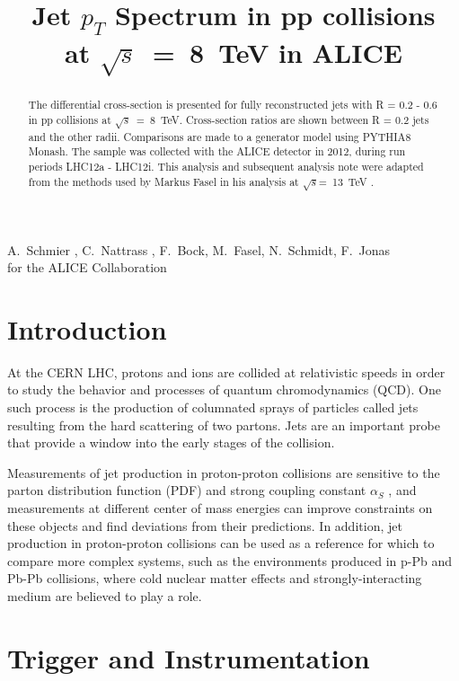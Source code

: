 \documentclass[ALICE]{ALICE_analysis_notes}
\newcommand{\s}{$\sqrt{s}$\xspace}
\newcommand{\pp}{pp\xspace}
\begin{document}
\title{Jet $p_T$ Spectrum in pp collisions \\
at $\sqrt{s}$~=~8~TeV in ALICE}


\begin{Authlist}
A.~Schmier ,
C.~Nattrass ,
F.~Bock, 
M.~Fasel,
N.~Schmidt,
F.~Jonas\\
for the ALICE Collaboration
\end{Authlist}



\vspace{4cm}
\begin{abstract}
The differential cross-section is presented for fully reconstructed jets with R = 0.2 - 0.6 in \pp collisions at \s~=~8~TeV. Cross-section ratios are shown between R = 0.2 jets and the other radii. Comparisons are made to a generator model using PYTHIA8 Monash. The sample was collected with the ALICE detector in 2012, during run periods LHC12a - LHC12i. This analysis and subsequent analysis note were adapted from the methods used by Markus Fasel in his analysis at \s =~13~TeV \cite{anaNoteMFasel}.
\end{abstract}

\newpage

\tableofcontents

\clearpage{}\section{Introduction}
\label{chap:Introduction}

At the CERN LHC, protons and ions are collided at relativistic speeds in order to study the behavior and processes of quantum chromodynamics (QCD). One such process is the production of columnated sprays of particles called jets resulting from the hard scattering of two partons. Jets are an important probe that provide a window into the early stages of the collision.

Measurements of jet production in proton-proton collisions are sensitive to the parton distribution function (PDF) and strong coupling constant $\alpha_{S}$ \cite{CMSPDFConstraints}, and measurements at different center of mass energies can improve constraints on these objects and find deviations from their predictions. In addition, jet production in proton-proton collisions can be used as a reference for which to compare more complex systems, such as the environments produced in p-Pb and Pb-Pb collisions, where cold nuclear matter effects and strongly-interacting medium are believed to play a role.\clearpage{}
\clearpage{}\section{Trigger and Instrumentation}
\label{chap:TriggerAndInstrumentation}
\end{document}
